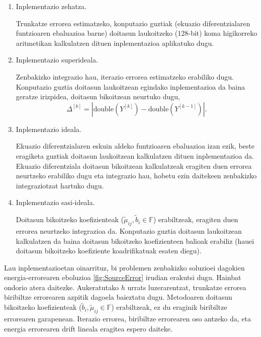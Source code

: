 \begin{enumerate}
\renewcommand{\theenumi}{\Alph{enumi}}

\item Inplementazio zehatza.

Trunkatze errorea estimatzeko, konputazio guztiak (ekuazio diferentzialaren funtzioaren ebaluazioa barne) doitasun laukoitzeko ($128$-bit) koma higikorreko aritmetikan kalkulatzen dituen inplementazioa aplikatuko dugu. 


\item Inplementazio superideala.

Zenbakizko integrazio hau, iterazio errorea estimatzeko erabiliko dugu. Konputazio guztia doitasun laukoitzean egindako inplementazioa da baina geratze irizpidea, doitasun bikoitzean neurtuko dugu,
\begin{equation*}
\Delta^{[k]}=|\text{double}(Y^{[k]})-\text{double}(Y^{[k-1]})|.
\end{equation*}

\item Inplementazio ideala.

Ekuazio diferentzialaren eskuin aldeko funtzioaren ebaluazioa izan ezik, beste eragiketa guztiak doitasun laukoitzean kalkulatzen dituen inplementazioa da. Ekuazio diferentziala doitasun bikoitzean kalkulatzeak eragiten duen errorea neurtzeko erabiliko dugu eta integrazio hau, hobetu ezin daitekeen zenbakizko integraziotzat hartuko dugu.  

\item Inplementazio sasi-ideala.

Doitasun bikoitzeko koefizienteak ($\tilde{\mu}_{ij},\tilde{b}_i \in \mathbb{F}$) erabiltzeak, eragiten duen errorea neurtzeko integrazioa da. Konputazio guztia doitasun laukoitzean kalkulatzen da baina doitasun bikoitzeko koefizienteen balioak erabiliz (hauei doitasun bikoitzeko koefiziente koadrifikatuak esaten diegu). 

\end{enumerate}

Lau inplementazioetan oinarrituz, bi problemen zenbakizko soluzioei dagokien energia-errorearen eboluzioa \ref{fig:SourceError} irudian erakutsi dugu. Hainbat ondorio atera daitezke. Aukeratutako $h$ urrats luzerarentzat, trunkatze errorea biribiltze errorearen azpitik dagoela baieztatu dugu. Metodoaren doitasun bikoitzeko koefizienteak ($\tilde{b}_i, \tilde{\mu}_{ij}\in \mathbb{F}$) erabiltzeak, ez du eraginik biribiltze errorearen garapenean.  Iterazio errorea, biribiltze errorearen oso antzeko da, eta energia errorearen drift lineala eragitea espero daiteke. 

